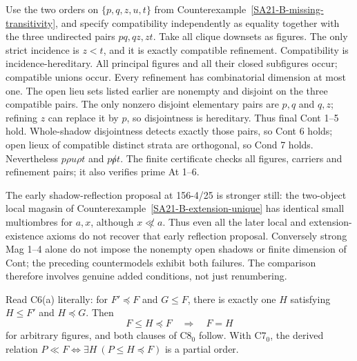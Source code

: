 \begin{counterexample}
\label{SA21-B-Cont-counter}
Use the two orders on \(\{p,q,z,u,t\}\) from
Counterexample~\ref{SA21-B-missing-transitivity}, and specify
compatibility independently as equality together with the three
undirected pairs \(pq,qz,zt\). Take all clique downsets as figures.
The only strict incidence is \(z<t\), and it is exactly compatible
refinement. Compatibility is incidence-hereditary. All principal
figures and all their closed subfigures occur; compatible unions
occur. Every refinement has combinatorial dimension at most one.
The open lieu sets listed earlier are nonempty and disjoint on
the three compatible pairs. The only nonzero disjoint elementary
pairs are \(p,q\) and \(q,z\); refining \(z\) can replace it by
\(p\), so disjointness is hereditary. Thus final Cont 1--5 hold.
Whole-shadow disjointness detects exactly those pairs, so Cont 6
holds; open lieux of compatible distinct strata are orthogonal,
so Cond 7 holds. Nevertheless \(p\rho u\rho t\) and
\(p\not\rho t\). The finite certificate checks all figures,
carriers and refinement pairs; it also verifies prime At 1--6.
\end{counterexample}

The early shadow-reflection proposal at 156-4/25 is stronger still:
the two-object local magasin of
Counterexample~\ref{SA21-B-extension-unique} has identical small
multiombres for \(a,x\), although \(x\not\ll a\). Thus even all
the later local and extension-existence axioms do not recover that
early reflection proposal. Conversely strong Mag 1--4 alone do
not impose the nonempty open shadows or finite dimension of Cont;
the preceding countermodels exhibit both failures. The comparison
therefore involves genuine added conditions, not just renumbering.

\begin{proposition}
\label{SA21-B-C6-C8}
Read C6(a) literally: for \(F'\preceq F\) and \(G\leq F\), there is
exactly one \(H\) satisfying \(H\leq F'\) and \(H\preceq G\).
Then
\[
 F\leq H\preceq F\quad\Longrightarrow\quad F=H
\]
for arbitrary figures, and both clauses of C8\(_0\) follow.
With C7\(_0\), the derived relation
\(P\ll F\Longleftrightarrow\exists H\ (P\leq H\preceq F)\)
is a partial order.
\end{proposition}

